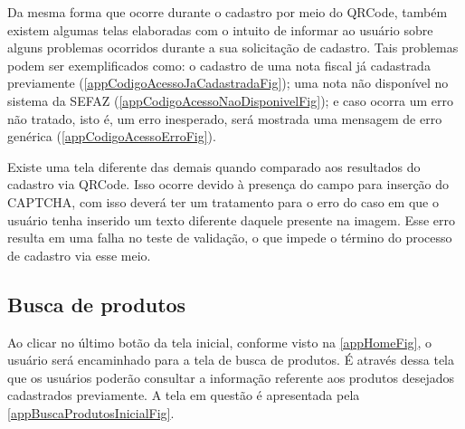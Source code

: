 Da mesma forma que ocorre durante o cadastro por meio do QRCode, também existem algumas telas elaboradas com o intuito de informar ao usuário sobre alguns problemas ocorridos durante a sua solicitação de cadastro. Tais problemas podem ser exemplificados como: o cadastro de uma nota fiscal já cadastrada previamente (\autoref{appCodigoAcessoJaCadastradaFig}); uma nota não disponível no sistema da SEFAZ (\autoref{appCodigoAcessoNaoDisponivelFig}); e caso ocorra um erro não tratado, isto é, um erro inesperado, será mostrada uma mensagem de erro genérica (\autoref{appCodigoAcessoErroFig}).

Existe uma tela diferente das demais quando comparado aos resultados do cadastro via QRCode. Isso ocorre devido à presença do campo para inserção do CAPTCHA, com isso deverá ter um tratamento para o erro do caso em que o usuário tenha inserido um texto diferente daquele presente na imagem. Esse erro resulta em uma falha no teste de validação, o que impede o término do processo de cadastro via esse meio.

\subsection{Busca de produtos}

Ao clicar no último botão da tela inicial, conforme visto na \autoref{appHomeFig}, o usuário será encaminhado para a tela de busca de produtos. É através dessa tela que os usuários poderão consultar a informação referente aos produtos desejados cadastrados previamente. A tela em questão é apresentada pela \autoref{appBuscaProdutosInicialFig}.

